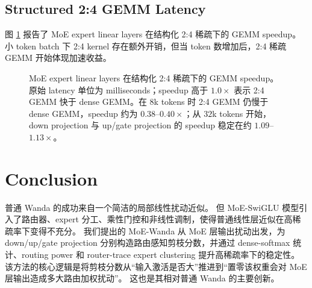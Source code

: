 \documentclass[letterpaper]{article}
\begin{document}
\subsection{Structured 2:4 GEMM Latency}

图 \ref{fig:moe_24_gemm_speedup} 报告了 MoE expert linear layers 在结构化 2:4 稀疏下的 GEMM speedup。
小 token batch 下 2:4 kernel 存在额外开销，但当 token 数增加后，2:4 稀疏 GEMM 开始体现加速收益。
\begin{figure}[htbp]
\centering
{}
\caption{\small{MoE expert linear layers 在结构化 2:4 稀疏下的 GEMM speedup。原始 latency 单位为 milliseconds；speedup 高于 $1.0\times$ 表示 2:4 GEMM 快于 dense GEMM。在 $8$k tokens 时 2:4 GEMM 仍慢于 dense GEMM，speedup 约为 $0.38$--$0.40\times$；从 $32$k tokens 开始，down projection 与 up/gate projection 的 speedup 稳定在约 $1.09$--$1.13\times$。}}
\label{fig:moe_24_gemm_speedup}
\end{figure}


\section{Conclusion}

普通 Wanda 的成功来自一个简洁的局部线性扰动近似。
但 MoE-SwiGLU 模型引入了路由器、expert 分工、乘性门控和非线性调制，使得普通线性层近似在高稀疏率下变得不充分。
我们提出的 MoE-Wanda 从 MoE 层输出扰动出发，为 down/up/gate projection 分别构造路由感知剪枝分数，并通过 dense-softmax 统计、routing power 和 router-trace expert clustering 提升高稀疏率下的稳定性。
该方法的核心逻辑是将剪枝分数从“输入激活是否大”推进到“置零该权重会对 MoE 层输出造成多大路由加权扰动”。
这也是其相对普通 Wanda 的主要创新。
\end{document}
